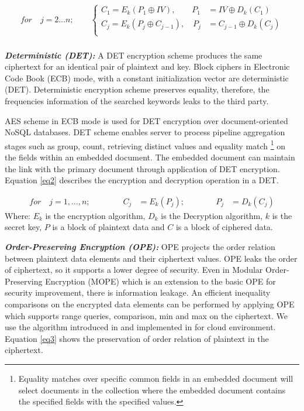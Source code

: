 \begin{equation} 
\label{eq1}
\begin{aligned}
for \quad j=2 \ldots n ;\qquad  \begin{cases}
C_1  = E_k(P_1 \oplus IV), \qquad  P_1 &= IV \oplus D_k(C_1) \\
C_j  = E_k(P_j \oplus C_{j-1}), \quad 
P_j &= C_{j-1} \oplus 
D_k(C_j)\\ 
\end{cases}\\
\end{aligned}
\end{equation}

\medskip

\noindent \textbf{\textit{Deterministic (DET):}}  A DET encryption scheme produces the same ciphertext for an identical pair of plaintext and key. Block ciphers in Electronic Code Book (ECB) mode, with a constant initialization vector are deterministic (DET). Deterministic encryption scheme preserves equality, therefore, the frequencies information of the searched keywords leaks to the third party. 

AES scheme in ECB mode is used for DET encryption over document-oriented NoSQL databases. DET scheme enables server to process pipeline aggregation stages such as group, count, retrieving distinct values and equality match \footnote{Equality matches over specific common fields in an embedded document will select documents in the collection where the embedded document contains the specified fields with the specified values.} on the fields within an embedded document. The embedded document can maintain the link with the primary document through application of DET encryption. Equation \ref{eq2} describes the encryption and decryption operation in a DET.

\begin{equation} \label{eq2}
\begin{aligned}
for \quad j=1, \ldots, n ;  \qquad \qquad  C_j & = E_k(P_j); \qquad \quad 
& P_j & = D_k(C_j) 
\end{aligned}
\end{equation}
\normalsize Where: $E_k$ is the encryption algorithm, $D_k$ is the Decryption algorithm, $k$ is the secret key, $P$ is a block of plaintext data and $C$ is a block of ciphered data.


\normalsize

\medskip

\noindent \textbf{\textit{Order-Preserving Encryption (OPE):}} OPE projects the order relation between plaintext data elements and their ciphertext values. OPE leaks the order of ciphertext, so it supports a lower degree of security. Even in Modular Order-Preserving Encryption (MOPE) \cite{Mavroforakis:2015:MOE:2723372.2749455} which is an extension to the basic OPE for security improvement, there is information leakage. An efficient inequality comparisons on the encrypted data elements can be performed by applying OPE which supports range queries, comparison, min and max on the ciphertext. We use the algorithm introduced in \cite{boldyreva2009order} and implemented in \cite{ahmadian2014security} for cloud environment. Equation \ref{eq3} shows the preservation of order relation of plaintext in the ciphertext.

